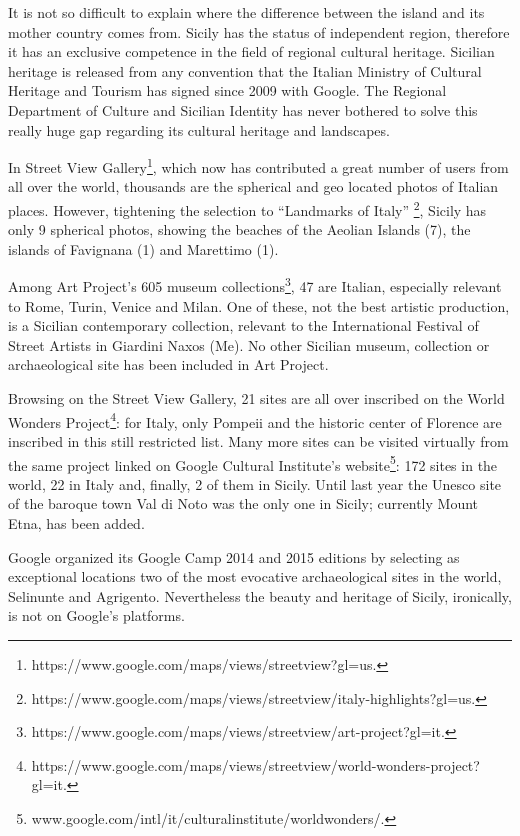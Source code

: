 \documentclass[amsthm,ebook]{saparticle}
\begin{document}
It is not so difficult to explain where the difference between the island and its mother country comes from. Sicily has
the status of independent region, therefore it has an exclusive competence in the field of regional cultural heritage.
Sicilian heritage is released from any convention that the Italian Ministry of Cultural Heritage and Tourism has signed
since 2009 with Google. The Regional Department of Culture and Sicilian Identity has never bothered to solve this
really huge gap regarding its cultural heritage and landscapes.

In Street View Gallery\footnote{https://www.google.com/maps/views/streetview?gl=us.}, which now has contributed a great
number of users from all over the world, thousands are the spherical and geo located photos of Italian places. However,
tightening the selection to “Landmarks of Italy”
\footnote{https://www.google.com/maps/views/streetview/italy-highlights?gl=us.}, Sicily has only 9 spherical photos,
showing the beaches of the Aeolian Islands (7), the islands of Favignana (1) and Marettimo (1). 

Among Art Project’s 605 museum collections\footnote{https://www.google.com/maps/views/streetview/art-project?gl=it.}, 47
are Italian, especially relevant to Rome, Turin, Venice and Milan. One of these, not the best artistic production, is a
Sicilian contemporary collection, relevant to the International Festival of Street Artists in Giardini Naxos (Me). No
other Sicilian museum, collection or archaeological site has been included in Art Project.

Browsing on the Street View Gallery, 21 sites are all over inscribed on the World Wonders
Project\footnote{https://www.google.com/maps/views/streetview/world-wonders-project?gl=it.}: for Italy, only Pompeii
and the historic center of Florence are inscribed in this still restricted list. Many more sites can be visited
virtually from the same project linked on Google Cultural Institute’s
website\footnote{www.google.com/intl/it/culturalinstitute/worldwonders/. }: 172 sites in the world, 22 in Italy and,
finally, 2 of them in Sicily. Until last year the Unesco site of the baroque town Val di Noto was the only one in
Sicily; currently Mount Etna, has been added. 

Google organized its Google Camp 2014 and 2015 editions by selecting as exceptional locations two of the most evocative
archaeological sites in the world, Selinunte and Agrigento. Nevertheless the beauty and heritage of Sicily, ironically,
is not on Google’s platforms.
\end{document}
